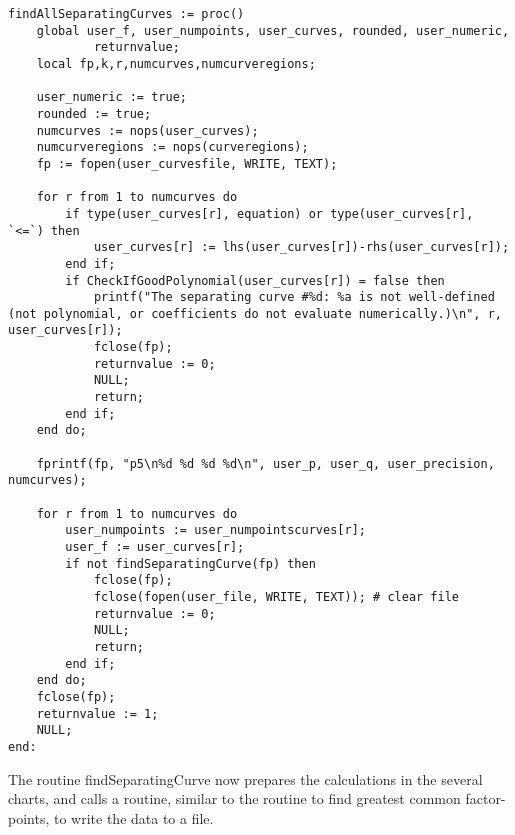 \documentclass[a4paper,10pt]{article}
\begin{document}
\begin{lstlisting}[name=separatingcurves]
findAllSeparatingCurves := proc()
    global user_f, user_numpoints, user_curves, rounded, user_numeric,
            returnvalue;
    local fp,k,r,numcurves,numcurveregions;

    user_numeric := true;
    rounded := true;
    numcurves := nops(user_curves);
    numcurveregions := nops(curveregions);
    fp := fopen(user_curvesfile, WRITE, TEXT);

    for r from 1 to numcurves do
        if type(user_curves[r], equation) or type(user_curves[r], `<=`) then
            user_curves[r] := lhs(user_curves[r])-rhs(user_curves[r]);
        end if;
        if CheckIfGoodPolynomial(user_curves[r]) = false then
            printf("The separating curve #%d: %a is not well-defined (not polynomial, or coefficients do not evaluate numerically.)\n", r, user_curves[r]);
            fclose(fp);
            returnvalue := 0;
            NULL;
            return;
        end if;
    end do;

    fprintf(fp, "p5\n%d %d %d %d\n", user_p, user_q, user_precision, numcurves);

    for r from 1 to numcurves do
        user_numpoints := user_numpointscurves[r];
        user_f := user_curves[r];
        if not findSeparatingCurve(fp) then
            fclose(fp);
            fclose(fopen(user_file, WRITE, TEXT)); # clear file
            returnvalue := 0;
            NULL;
            return;
        end if;
    end do;
    fclose(fp);
    returnvalue := 1;
    NULL;
end:
\end{lstlisting}

The routine findSeparatingCurve now prepares the calculations in the several
charts, and calls a routine, similar to the routine to find greatest common
factor-points, to write the data to a file.
\end{document}
